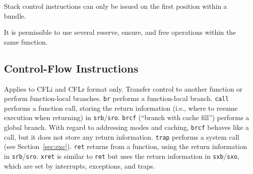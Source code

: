 \documentclass[a4paper,fontsize=10pt,twoside,DIV15,BCOR12mm,headinclude=true,footinclude=false,pagesize,bibtotoc]{scrbook}
\newcommand{\code}[1]{{\texttt{#1}}}
\newcommand{\comment}[3]{

\textsf{\textbf{#1}} {\color{#3}#2}}
\newcommand{\stefan}[1]{\comment{Stefan}{#1}{RoyalPurple}}
\newcommand{\sahar}[1]{\comment{Sahar}{#1}{Green}}
\renewcommand{\stefan}[1]{}
\renewcommand{\sahar}[1]{}
\begin{document}
Stack control instructions can only be issued on the first position within a
bundle.

It is permissible to use several reserve, ensure, and free operations within the
same function.


\stefan{We only need sens and sspill with registers for context-switch. Should we allow a
register version for sres and sfree as well nevertheless (I would say no)?}

\stefan{At the moment, the way it is implemented in the simulator, we have a 1-cycle hazard between
any STC instruction and a mfs, and a 1-cycle hazard between any two STC instructions, since STC
modifies the special registers in the MW stage, while mfs reads in the EX stage.
Is this the same for the hardware?

This (and all hazards for all other instructions) should be documented here in the TR explicitly, since it is a pain to debug!}

\sahar{Special registers are written/read separately. Is this 1-cycle hazard necessary? What is the reason to add it?}

\stefan{The reason for the hazards is primarily the current implementation of the simulator, there the special registers
are updated separately from the internal stack pointers, which causes the hazards. We should define how the
hardware actually behaves, and then the simulator should be updated to reflect that behavior. However, the latter is not quite trivial, I will
leave that to Florian ;) }

\clearpage
\subsection{Control-Flow Instructions}

Applies to CFLi and CFLr format only.
Transfer control to another function or perform function-local branches.
\texttt{br} performs a function-local branch.
\texttt{call} performs a function call, storing the return information
(i.e., where to resume execution when returning) in
\texttt{srb}/\texttt{sro}.
\texttt{brcf} (``branch with cache fill'') performs a global
branch. With regard to addressing modes and caching, \texttt{brcf}
behaves like a call, but it does not store any return information.
\texttt{trap} performs a system call (see Section~\ref{sec:exc}).
\texttt{ret} returns from a function, using the return information in
\texttt{srb}/\texttt{sro}.
\texttt{xret} is similar to \code{ret} but uses the return information
in \texttt{sxb}/\texttt{sxo}, which are set by interrupts, exceptions,
and traps.
\end{document}

